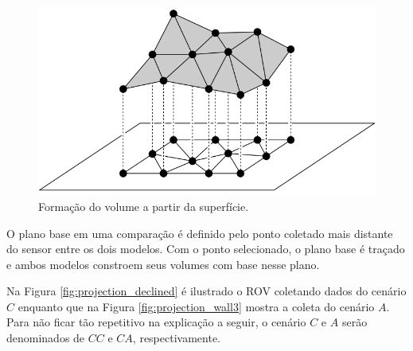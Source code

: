 \begin{figure}[H]
    \centering
    \includegraphics[scale=0.5]{dados/figuras/prisms.png}
    \caption{Formação do volume a partir da superfície.}
    \vspace{-0.8em}
    \label{fig:prism}
\end{figure}

O plano base em uma comparação é definido pelo ponto coletado mais distante do sensor entre os dois modelos.
Com o ponto selecionado, o plano base é traçado e ambos modelos constroem seus volumes com base nesse plano.

Na Figura \ref{fig:projection_declined} é ilustrado o ROV coletando dados do cenário $C$ enquanto que na Figura \ref{fig:projection_wall3} mostra a coleta do cenário $A$.
Para não ficar tão repetitivo na explicação a seguir, o cenário $C$ e $A$ serão denominados de $CC$ e $CA$, respectivamente.

